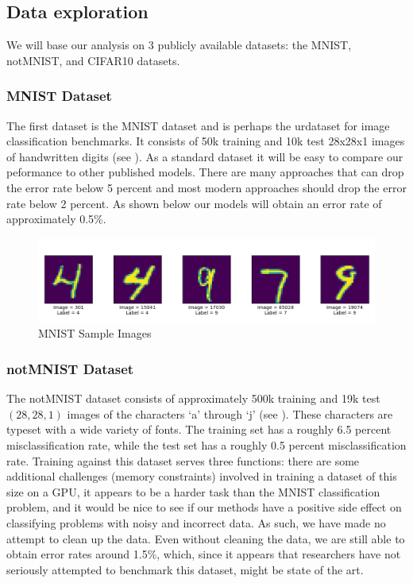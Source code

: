 \documentclass[english,a4paper,oneside]{amsart}
\theoremstyle{definition}
\begin{document}
\subsection{Data exploration}
We will base our analysis on 3 publicly available datasets: the MNIST,  notMNIST, and CIFAR10 datasets. 

\subsubsection{MNIST Dataset}
The first dataset is the MNIST dataset and is perhaps the urdataset for image classification benchmarks. It consists of 50k training and 10k test 28x28x1 images of handwritten digits (see ). As a standard dataset it will be easy to compare our peformance to other published models. There are many approaches that can drop the error rate below 5 percent and most modern approaches should drop the error rate below 2 percent.  As shown below our models will obtain an error rate of approximately 0.5\%.
\begin{figure}[H]
	\begin{center} \includegraphics[scale=0.5]{images/MNIST_Sample_Images.png}\end{center}
	\caption{MNIST Sample Images}\label{MNISTFig}
\end{figure}

\subsubsection{notMNIST Dataset}
The notMNIST dataset consists of approximately 500k training and 19k test $(28,28,1)$ images of the characters `a' through `j' (see ). These characters are typeset with a wide variety of fonts. The training set has a roughly 6.5 percent misclassification rate, while the test set has a roughly 0.5 percent misclassification rate. Training against this dataset serves three functions: there are some additional challenges (memory constraints) involved in training a dataset of this size on a GPU, it appears to be a harder task than the MNIST classification problem, and it would be nice to see if our methods have a positive side effect on classifying problems with noisy and incorrect data. As such, we have made no attempt to clean up the data. Even without cleaning the data, we are still able to obtain error rates around 1.5\%, which, since it appears that researchers have not seriously attempted to benchmark this dataset, might be state of the art.
\end{document}
